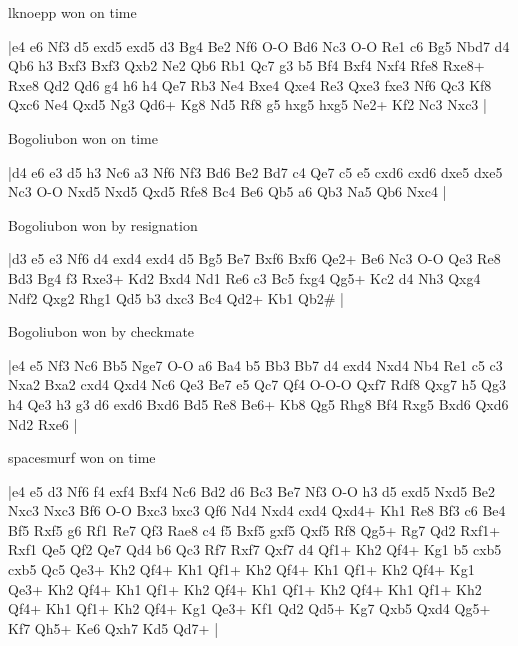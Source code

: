 \showboard

lknoepp won on time

\makegametitle
|e4 e6 Nf3 d5 exd5 exd5 d3 Bg4 Be2 Nf6 O-O Bd6 Nc3 O-O Re1 c6 Bg5 Nbd7 d4 Qb6 h3 Bxf3 Bxf3 Qxb2 Ne2 Qb6 Rb1 Qc7 g3 b5 Bf4 Bxf4 Nxf4 Rfe8 Rxe8+ Rxe8 Qd2 Qd6 g4 h6 h4 Qe7 Rb3 Ne4 Bxe4 Qxe4 Re3 Qxe3 fxe3 Nf6 Qc3 Kf8 Qxc6 Ne4 Qxd5 Ng3 Qd6+ Kg8 Nd5 Rf8 g5 hxg5 hxg5 Ne2+ Kf2 Nc3 Nxc3  |

\showboard

Bogoliubon won on time

\makegametitle
|d4 e6 e3 d5 h3 Nc6 a3 Nf6 Nf3 Bd6 Be2 Bd7 c4 Qe7 c5 e5 cxd6 cxd6 dxe5 dxe5 Nc3 O-O Nxd5 Nxd5 Qxd5 Rfe8 Bc4 Be6 Qb5 a6 Qb3 Na5 Qb6 Nxc4  |

\showboard

Bogoliubon won by resignation

\makegametitle
|d3 e5 e3 Nf6 d4 exd4 exd4 d5 Bg5 Be7 Bxf6 Bxf6 Qe2+ Be6 Nc3 O-O Qe3 Re8 Bd3 Bg4 f3 Rxe3+ Kd2 Bxd4 Nd1 Re6 c3 Bc5 fxg4 Qg5+ Kc2 d4 Nh3 Qxg4 Ndf2 Qxg2 Rhg1 Qd5 b3 dxc3 Bc4 Qd2+ Kb1 Qb2\#  |

\showboard

Bogoliubon won by checkmate

\makegametitle
|e4 e5 Nf3 Nc6 Bb5 Nge7 O-O a6 Ba4 b5 Bb3 Bb7 d4 exd4 Nxd4 Nb4 Re1 c5 c3 Nxa2 Bxa2 cxd4 Qxd4 Nc6 Qe3 Be7 e5 Qc7 Qf4 O-O-O Qxf7 Rdf8 Qxg7 h5 Qg3 h4 Qe3 h3 g3 d6 exd6 Bxd6 Bd5 Re8 Be6+ Kb8 Qg5 Rhg8 Bf4 Rxg5 Bxd6 Qxd6 Nd2 Rxe6  |

\showboard

spacesmurf won on time

\makegametitle
|e4 e5 d3 Nf6 f4 exf4 Bxf4 Nc6 Bd2 d6 Bc3 Be7 Nf3 O-O h3 d5 exd5 Nxd5 Be2 Nxc3 Nxc3 Bf6 O-O Bxc3 bxc3 Qf6 Nd4 Nxd4 cxd4 Qxd4+ Kh1 Re8 Bf3 c6 Be4 Bf5 Rxf5 g6 Rf1 Re7 Qf3 Rae8 c4 f5 Bxf5 gxf5 Qxf5 Rf8 Qg5+ Rg7 Qd2 Rxf1+ Rxf1 Qe5 Qf2 Qe7 Qd4 b6 Qc3 Rf7 Rxf7 Qxf7 d4 Qf1+ Kh2 Qf4+ Kg1 b5 cxb5 cxb5 Qc5 Qe3+ Kh2 Qf4+ Kh1 Qf1+ Kh2 Qf4+ Kh1 Qf1+ Kh2 Qf4+ Kg1 Qe3+ Kh2 Qf4+ Kh1 Qf1+ Kh2 Qf4+ Kh1 Qf1+ Kh2 Qf4+ Kh1 Qf1+ Kh2 Qf4+ Kh1 Qf1+ Kh2 Qf4+ Kg1 Qe3+ Kf1 Qd2 Qd5+ Kg7 Qxb5 Qxd4 Qg5+ Kf7 Qh5+ Ke6 Qxh7 Kd5 Qd7+  |

